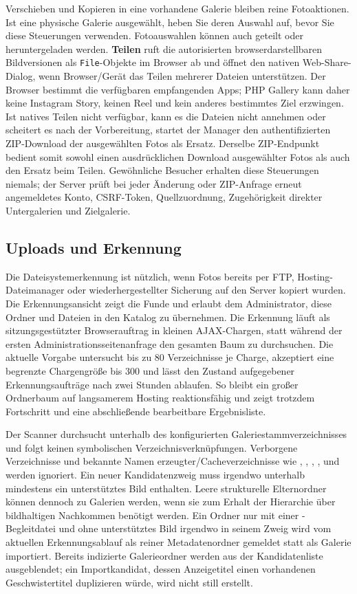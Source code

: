 \documentclass[11pt,a4paper]{article}
\newcommand{\filepath}[1]{\path{#1}}
\newcommand{\ui}[1]{\textbf{#1}}
\newcommand{\codeword}[1]{\nolinkurl{#1}}
\begin{document}
Verschieben und Kopieren in eine vorhandene Galerie bleiben reine Fotoaktionen.
Ist eine physische Galerie ausgewählt, heben Sie deren Auswahl auf, bevor Sie
diese Steuerungen verwenden. Fotoauswahlen können auch geteilt oder
heruntergeladen werden. \ui{Teilen} ruft die autorisierten browserdarstellbaren
Bildversionen als \codeword{File}-Objekte im Browser ab und öffnet den nativen
Web-Share-Dialog, wenn Browser/Gerät das Teilen mehrerer Dateien unterstützen.
Der Browser bestimmt die verfügbaren empfangenden Apps; PHP Gallery kann daher
keine Instagram Story, keinen Reel und kein anderes bestimmtes Ziel erzwingen.
Ist natives Teilen nicht verfügbar, kann es die Dateien nicht annehmen oder
scheitert es nach der Vorbereitung, startet der Manager den authentifizierten
ZIP-Download der ausgewählten Fotos als Ersatz. Derselbe ZIP-Endpunkt bedient
somit sowohl einen ausdrücklichen Download ausgewählter Fotos als auch den
Ersatz beim Teilen. Gewöhnliche Besucher erhalten diese Steuerungen niemals; der
Server prüft bei jeder Änderung oder ZIP-Anfrage erneut angemeldetes Konto,
CSRF-Token, Quellzuordnung, Zugehörigkeit direkter Untergalerien und
Zielgalerie.

\subsection{Uploads und Erkennung}

Die Dateisystemerkennung ist nützlich, wenn Fotos bereits per FTP,
Hosting-Dateimanager oder wiederhergestellter Sicherung auf den Server kopiert
wurden. Die Erkennungsansicht zeigt die Funde und erlaubt dem Administrator,
diese Ordner und Dateien in den Katalog zu übernehmen. Die Erkennung läuft als
sitzungsgestützter Browserauftrag in kleinen AJAX-Chargen, statt während der
ersten Administrationsseitenanfrage den gesamten Baum zu durchsuchen. Die
aktuelle Vorgabe untersucht bis zu 80 Verzeichnisse je Charge, akzeptiert eine
begrenzte Chargengröße bis 300 und lässt den Zustand aufgegebener
Erkennungsaufträge nach zwei Stunden ablaufen. So bleibt ein großer Ordnerbaum
auf langsamerem Hosting reaktionsfähig und zeigt trotzdem Fortschritt und eine
abschließende bearbeitbare Ergebnisliste.

Der Scanner durchsucht unterhalb des konfigurierten Galeriestammverzeichnisses
und folgt keinen symbolischen Verzeichnisverknüpfungen. Verborgene Verzeichnisse
und bekannte Namen erzeugter/Cacheverzeichnisse wie \filepath{cache},
\filepath{thumbs}, \filepath{thumbnail}, \filepath{thumbnails},
\filepath{preview} und \filepath{previews} werden ignoriert. Ein neuer
Kandidatenzweig muss irgendwo unterhalb mindestens ein unterstütztes Bild
enthalten. Leere strukturelle Elternordner können dennoch zu Galerien werden,
wenn sie zum Erhalt der Hierarchie über bildhaltigen Nachkommen benötigt werden.
Ein Ordner nur mit einer \filepath{gallery.json}-Begleitdatei und ohne
unterstütztes Bild irgendwo in seinem Zweig wird vom aktuellen Erkennungsablauf
als reiner Metadatenordner gemeldet statt als Galerie importiert. Bereits
indizierte Galerieordner werden aus der Kandidatenliste ausgeblendet; ein
Importkandidat, dessen Anzeigetitel einen vorhandenen Geschwistertitel
duplizieren würde, wird nicht still erstellt.
\end{document}
